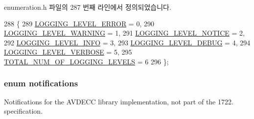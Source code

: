 enumeration.\+h 파일의 287 번째 라인에서 정의되었습니다.


\begin{DoxyCode}
288 \{
289     \hyperlink{namespaceavdecc__lib_a501055c431e6872ef46f252ad13f85cdaf2c4481208273451a6f5c7bb9770ec8a}{LOGGING\_LEVEL\_ERROR} = 0,
290     \hyperlink{namespaceavdecc__lib_a501055c431e6872ef46f252ad13f85cda73e497c552710fe969c37fafc6d59f97}{LOGGING\_LEVEL\_WARNING} = 1,
291     \hyperlink{namespaceavdecc__lib_a501055c431e6872ef46f252ad13f85cda111acaa1af34b7059f578c5f073be78a}{LOGGING\_LEVEL\_NOTICE} = 2,
292     \hyperlink{namespaceavdecc__lib_a501055c431e6872ef46f252ad13f85cda83cf28d9171867799cee2619810e1c01}{LOGGING\_LEVEL\_INFO} = 3,
293     \hyperlink{namespaceavdecc__lib_a501055c431e6872ef46f252ad13f85cdae3138c2a0a71a6404155ff912e450406}{LOGGING\_LEVEL\_DEBUG} = 4,
294     \hyperlink{namespaceavdecc__lib_a501055c431e6872ef46f252ad13f85cdaee10ea7e3b81aa9496eab6a9c80adb1d}{LOGGING\_LEVEL\_VERBOSE} = 5,
295     \hyperlink{namespaceavdecc__lib_a501055c431e6872ef46f252ad13f85cdaa5712f55b81ef86fafd150c81ba0fc14}{TOTAL\_NUM\_OF\_LOGGING\_LEVELS} = 6
296 \};
\end{DoxyCode}
\subsubsection[{\texorpdfstring{notifications}{notifications}}]{\setlength{\rightskip}{0pt plus 5cm}enum {\bf notifications}}\hypertarget{namespaceavdecc__lib_ad2a3e740ca3019cf9fd0f9514afb6419}{}\label{namespaceavdecc__lib_ad2a3e740ca3019cf9fd0f9514afb6419}


Notifications for the A\+V\+D\+E\+CC library implementation, not part of the 1722. specification. 

